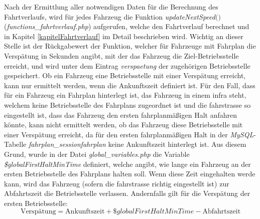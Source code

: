 Nach der Ermittlung aller notwendigen Daten für die Berechnung des Fahrtverlaufs, wird für jedes Fahrzeug die Funktion \textit{updateNextSpeed$($$)$} (\textit{functions\_fahrtverlauf.php}) aufgerufen, welche den Fahrtverlauf berechnet und in Kapitel \ref{kapitelFahrtverlauf} im Detail beschrieben wird. Wichtig an dieser Stelle ist der Rückgabewert der Funktion, welcher für Fahrzeuge mit Fahrplan die Verspätung in Sekunden angibt, mit der das Fahrzeug die Ziel-Betriebsstelle erreicht, und wird unter dem Eintrag \textit{verspaetung} der zugehörigen Betriebsstelle gespeichert. Ob ein Fahrzeug eine Betriebsstelle mit einer Verspätung erreicht, kann nur ermittelt werden, wenn die Ankunftszeit definiert ist. Für den Fall, dass für ein Fahrzeug ein Fahrplan hinterlegt ist, das Fahrzeug in einem \ac{infra} steht, welchem keine Betriebsstelle des Fahrplans zugeordnet ist und die \Gls{fahrstrasse} so eingestellt ist, dass das Fahrzeug den ersten fahrplanmäßigen Halt anfahren könnte, kann nicht ermittelt werden, ob das Fahrzeug diese Betriebsstelle mit einer Verspätung erreicht, da für den ersten fahrplanmäßigen Halt in der \textit{MySQL}-Tabelle \textit{fahrplan\_sessionfahrplan} keine Ankunftszeit hinterlegt ist. Aus diesem Grund, wurde in der Datei \textit{global\_variables.php} die Variable \textit{\$globalFirstHaltMinTime} definiert, welche angibt, wie lange ein Fahrzeug an der ersten Betriebsstelle des Fahrplans halten soll. Wenn diese Zeit eingehalten werde kann, wird das Fahrzeug (sofern die \Gls{fahrstrasse} richtig eingestellt ist) zur Abfahrtszeit die Betriebsstelle verlassen. Andernfalls gilt für die Verspätung der ersten Betriebsstelle:
\begin{equation*}
\textrm{Verspätung} = \textrm{Ankunftszeit} + \textit{\$globalFirstHaltMinTime} - \textrm{Abfahrtszeit}
\end{equation*}

